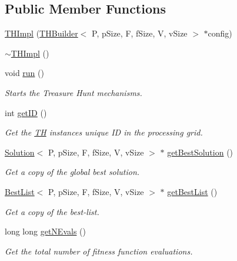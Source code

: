 \subsection*{Public Member Functions}
\begin{DoxyCompactItemize}
\item 
\hyperlink{classTHBuilder_1_1THImpl_a0d6e2fd43f50755ff2738e924f66690d}{T\+H\+Impl} (\hyperlink{classTHBuilder}{T\+H\+Builder}$<$ P, p\+Size, F, f\+Size, V, v\+Size $>$ $\ast$config)
\item 
\hyperlink{classTHBuilder_1_1THImpl_a844f4c665317e9c6e1d6af6b10081a60}{$\sim$\+T\+H\+Impl} ()
\item 
void \hyperlink{classTHBuilder_1_1THImpl_a943301db5154fd7b672119b5c9917303}{run} ()
\begin{DoxyCompactList}\small\item\em Starts the Treasure Hunt mechanisms. \end{DoxyCompactList}\item 
int \hyperlink{classTHBuilder_1_1THImpl_a0406a795161bcba315c11f21fa5a4770}{get\+ID} ()
\begin{DoxyCompactList}\small\item\em Get the \hyperlink{classTH}{TH} instance\textquotesingle{}s unique ID in the processing grid. \end{DoxyCompactList}\item 
\hyperlink{classSolution}{Solution}$<$ P, p\+Size, F, f\+Size, V, v\+Size $>$ $\ast$ \hyperlink{classTHBuilder_1_1THImpl_ad72a990d28806b4f39abd1afd6edbb93}{get\+Best\+Solution} ()
\begin{DoxyCompactList}\small\item\em Get a copy of the global best solution. \end{DoxyCompactList}\item 
\hyperlink{classBestList}{Best\+List}$<$ P, p\+Size, F, f\+Size, V, v\+Size $>$ $\ast$ \hyperlink{classTHBuilder_1_1THImpl_a0ad0fa3fc6f36c3c0b4e827c36b7f566}{get\+Best\+List} ()
\begin{DoxyCompactList}\small\item\em Get a copy of the best-\/list. \end{DoxyCompactList}\item 
long long \hyperlink{classTHBuilder_1_1THImpl_ae959cfedd62e1026015c28b4ffd65b29}{get\+N\+Evals} ()
\begin{DoxyCompactList}\small\item\em Get the total number of fitness function evaluations. \end{DoxyCompactList}\end{DoxyCompactItemize}


